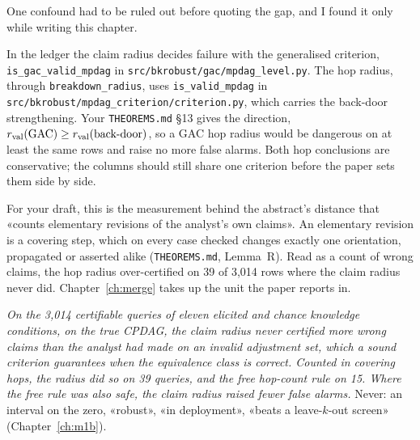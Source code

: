One confound had to be ruled out before quoting the gap, and I found it only while writing this chapter.

\begin{armadilha}
In the ledger the claim radius decides failure with the generalised criterion,
\texttt{is\_gac\_valid\_mpdag}
in \texttt{src/bkrobust/gac/mpdag\_level.py}. The hop radius, through \texttt{breakdown\_radius}, uses
\texttt{is\_valid\_mpdag} in \texttt{src/bkrobust/mpdag\_criterion/criterion.py}, which carries the
back-door strengthening. Your \texttt{THEOREMS.md} §13 gives the direction, $r_{\mathrm{val}}(\text{GAC}) \ge
r_{\mathrm{val}}(\text{back-door})$, so a GAC
hop radius would be dangerous on at least the same rows and raise no more false alarms. Both hop
conclusions are conservative; the columns should still share one criterion before the paper sets them
side by side.
\end{armadilha}

For your draft, this is the measurement behind the abstract's distance that «counts elementary revisions
of the analyst's own claims». An elementary revision is a covering step, which on every case checked
changes exactly one orientation, propagated or asserted alike (\texttt{THEOREMS.md}, Lemma~R). Read as a
count of wrong claims, the hop radius over-certified on 39 of 3,014 rows where the claim radius never
did. Chapter~\ref{ch:merge} takes up the unit the paper reports in.

\begin{sonorio}
\emph{On the 3,014 certifiable queries of eleven elicited and chance knowledge conditions, on the true CPDAG, the claim radius never
certified more wrong claims than the analyst had made on an invalid adjustment set, which a sound
criterion guarantees when the equivalence class is correct. Counted in covering hops, the radius did so
on 39 queries, and the free hop-count rule on 15. Where the free rule was also safe, the claim radius
raised fewer false alarms.} Never: an interval on the zero, «robust», «in deployment», «beats a
leave-$k$-out screen» (Chapter~\ref{ch:m1b}).
\end{sonorio}


